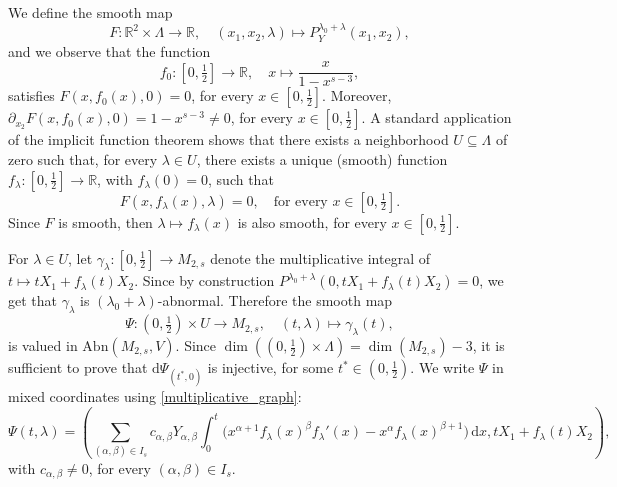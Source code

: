 \documentclass[a4paper,11pt,reqno]{amsart}
\theoremstyle{plain}
\theoremstyle{definition}
\newcommand{\R}{\mathbb R}
\newcommand{\de}{\mathrm{d}}
\newcommand{\abn}{\mathrm{Abn}}
\begin{document}
We define the smooth map
\begin{equation*}
    F \colon \R^2 \times \Lambda \to \R, \quad (x_1,x_2,\lambda) \mapsto P^{\lambda_0+\lambda}_Y(x_1,x_2),
\end{equation*}
and we observe that the function
\begin{equation*}
    f_0 \colon [0,\tfrac{1}{2}] \to \R, \quad x \mapsto \frac{x}{1 - x^{s-3}},
\end{equation*}
satisfies $F(x,f_0(x),0)=0$, for every $x \in [0,\tfrac{1}{2}]$. Moreover, $\partial_{x_2}F(x,f_0(x),0)=1-x^{s-3}\neq 0$, for every $x \in [0,\tfrac{1}{2}]$. A standard application of the implicit function theorem shows that there exists a neighborhood $U \subseteq \Lambda$ of zero such that, for every $\lambda \in U$, there exists a unique (smooth) function $f_\lambda \colon [0,\tfrac{1}{2}] \to \R$, with $f_\lambda(0)=0$, such that
\begin{equation} \label{eq:def_f_lambda}
    F(x,f_\lambda(x),\lambda)=0, \quad \text{for every $x \in [0,\tfrac{1}{2}]$}.
\end{equation}
Since $F$ is smooth, then $\lambda \mapsto f_\lambda(x)$ is also smooth, for every $x \in [0,\tfrac{1}{2}]$. 

For $\lambda \in U$, let $\gamma_\lambda \colon [0,\tfrac{1}{2}] \to M_{2,s}$ denote the multiplicative integral of $t \mapsto tX_1 + f_\lambda(t)X_2$. Since by construction $P^{\lambda_0+\lambda}(0,tX_1+f_\lambda(t)X_2)=0$, we get that $\gamma_\lambda$ is $(\lambda_0+\lambda)$-abnormal. Therefore the smooth map
\begin{equation*}
    \Psi \colon (0,\tfrac{1}{2}) \times U \to M_{2,s}, \quad (t,\lambda) \mapsto \gamma_\lambda(t),
\end{equation*}
is valued in $\abn(M_{2,s},V)$. Since $\dim((0,\tfrac{1}{2})\times \Lambda) = \dim(M_{2,s})-3$, it is sufficient to prove that $\de\Psi_{(t^*,0)}$ is injective,
for some $t^* \in (0,\tfrac{1}{2})$. We write $\Psi$ in mixed coordinates using \cref{multiplicative_graph}:
\begin{equation*}
    \Psi(t,\lambda)= \left(\sum_{(\alpha,\beta) \in I_s} c_{\alpha,\beta}Y_{\alpha,\beta}\int^t_0 \bigg(x^{\alpha+1}f_\lambda(x)^\beta f_\lambda'(x) - x^\alpha f_\lambda(x)^{\beta+1}\bigg)\, \de x, tX_1 + f_\lambda(t)X_2\right),
\end{equation*}
with $c_{\alpha,\beta} \neq 0$, for every $(\alpha,\beta) \in I_s$.
\end{document}
